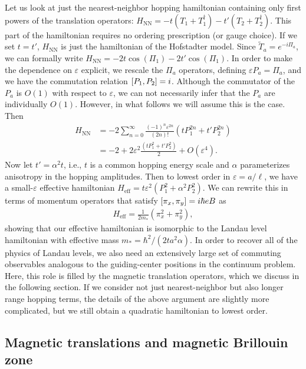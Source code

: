 \documentclass[aps,prb,twocolumn,letterpaper,twoside,nobalancelastpage,groupedaddress,amsmath,amssymb,floatfix,citeautoscript]{revtex4-1}
\begin{document}
Let us look at just the nearest-neighbor hopping hamiltonian containing only first powers of the translation operators: $H_{\text{NN}} = -t\left(T_1 + T_1^{\dag}\right) - t'\left(T_2 + T_2^{\dag}\right)$. This part of the hamiltonian requires no ordering prescription (or gauge choice). If we set $t = t'$, $H_{\text{NN}}$ is just the hamiltonian of the Hofstadter model. Since $\widetilde{T}_a = e^{-i\Pi_a}$, we can formally write $H_{\text{NN}}= -2t\cos\left(\Pi_1\right) - 2 t'\cos\left(\Pi_1\right).$ In order to make the dependence on $\varepsilon$ explicit, we rescale the $\Pi_a$ operators, defining $\varepsilon P_a = \Pi_a$, and we have the commutation relation $\comm{P_1}{P_2} = i$. Although the commutator of the $P_a$ is $O(1)$ with respect to $\varepsilon$, we can not necessarily infer that the $P_a$ are individually $O(1)$. However, in what follows we will assume this is the case. Then
\begin{align*}
H_{\text{NN}} &= -2\sum_{n=0}^{\infty}  \frac{(-1)^{n}\varepsilon^{2n}}{(2n)!} \left(t P^{2n}_1 + t'P^{2n}_2\right)\\
&= -2 + 2\varepsilon^2\frac{\left(t P^{2}_1 + t' P^{2}_2\right)}{2} +O(\varepsilon^4).
\end{align*}
Now let $t' = \alpha^2 t$, i.e., $t$ is a common hopping energy scale and $\alpha$ parameterizes anisotropy in the hopping amplitudes. Then to lowest order in $\varepsilon = a/\ell$, we have a small-$\varepsilon$ effective hamiltonian $H_{\text{eff}}= t\varepsilon^2 \left(P^{2}_1 + \alpha^2P^{2}_2\right)$. We can rewrite this in terms of momentum operators that satisfy $\comm{\pi_x}{\pi_y} = i\hbar e B$ as
\begin{align*}
H_{\text{eff}} = \frac{1}{2m_{\ast}}\left(\pi_x^2 + \pi_y^2\right),
\end{align*}
showing that our effective hamiltonian is isomorphic to the Landau level hamiltonian with effective mass $m_{\ast} = \hbar^2/(2ta^2\alpha)$. In order to recover all of the physics of Landau levels, we also need an extensively large set of commuting observables analogous to the guiding-center positions in the continuum problem. Here, this role is filled by the magnetic translation operators, which we discuss in the following section. If we consider not just nearest-neighbor but also longer range hopping terms, the details of the above argument are slightly more complicated, but we still obtain a quadratic hamiltonian to lowest order.

\subsection{Magnetic translations and magnetic Brillouin zone}
\end{document}
